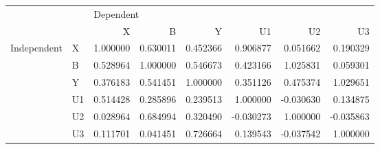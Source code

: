 \begin{tabular}{llrrrrrr}
\toprule
            &    & \multicolumn{6}{l}{Dependent} \\
            &    &         X &         B &         Y &        U1 &        U2 &        U3 \\
\midrule
Independent & X &  1.000000 &  0.630011 &  0.452366 &  0.906877 &  0.051662 &  0.190329 \\
            & B &  0.528964 &  1.000000 &  0.546673 &  0.423166 &  1.025831 &  0.059301 \\
            & Y &  0.376183 &  0.541451 &  1.000000 &  0.351126 &  0.475374 &  1.029651 \\
            & U1 &  0.514428 &  0.285896 &  0.239513 &  1.000000 & -0.030630 &  0.134875 \\
            & U2 &  0.028964 &  0.684994 &  0.320490 & -0.030273 &  1.000000 & -0.035863 \\
            & U3 &  0.111701 &  0.041451 &  0.726664 &  0.139543 & -0.037542 &  1.000000 \\
\bottomrule
\end{tabular}

